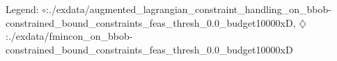 Legend: {\color{NavyBlue}$\circ$}:./exdata/augmented\_lagrangian\_constraint\_handling\_on\_bbob-constrained\_bound\_constraints\_feas\_thresh\_0.0\_budget10000xD, {\color{Magenta}$\diamondsuit$}:./exdata/fmincon\_on\_bbob-constrained\_bound\_constraints\_feas\_thresh\_0.0\_budget10000xD